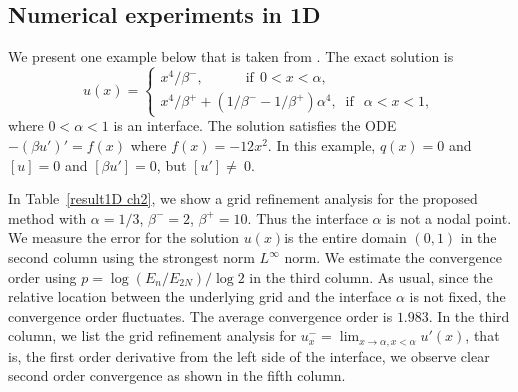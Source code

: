 \documentclass[11pt]{article}
\numberwithin{equation}{section}
\begin{document}
\subsection{Numerical experiments in 1D}

We present one example below that is taken from \cite{li2006immersed}.
The exact solution is
\begin{equation*}
  u(x)=
  \begin{cases}
    x^4/\beta^-, \qquad \quad  \textrm{if}~~ 0<x < \alpha,\\
    x^4/\beta^+ +(1/\beta^--1/\beta^+)\alpha^4, \; \;\textrm{if}~~ \; \alpha < x <1,
 \end{cases}
\end{equation*}
where $0<\alpha<1$ is an interface.
The solution satisfies the ODE $-(\beta u')'=f(x)$ where $f(x)=-12 x^2$.
In this example, $q(x)=0$ and $[u]=0$ and $[\beta u']=0$, but $[u']\neq~0$.








In Table~\ref{result1D ch2},
we show a grid refinement analysis for the proposed method with $\alpha=1/3$, $\beta^-=2$, $\beta^+=10$.
Thus the interface $\alpha$ is not a nodal point.
We measure the  error for the solution $u(x)$is the entire domain $(0,1)$
in the second column using the strongest norm $L^{\infty}$ norm.
We estimate the convergence order using $p = \log (E_n/E_{2N})/\log 2$ in the third column.
As usual, since the relative location between the underlying grid and the interface $\alpha$ is not fixed,
the convergence order fluctuates.
The average convergence order is $1.983$.
In the third column, we list the grid refinement analysis for $u_x^-=\lim_{x\rightarrow \alpha, x<\alpha} u'(x)$,
that is, the first order derivative from the left side of the interface,
we observe clear second order convergence as shown in the fifth column.
\end{document}
